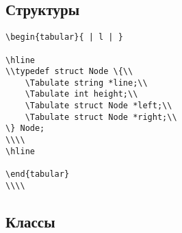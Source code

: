 \documentclass{article}
\begin{document}
\subsection{Структуры}
\begin{lstlisting}
\begin{tabular}{ | l | }

\hline
\\typedef struct Node \{\\
    \Tabulate string *line;\\
    \Tabulate int height;\\
    \Tabulate struct Node *left;\\
    \Tabulate struct Node *right;\\
\} Node;
\\\\
\hline

\end{tabular}
\\\\
\end{lstlisting}

\subsection{Классы}
\end{document}
